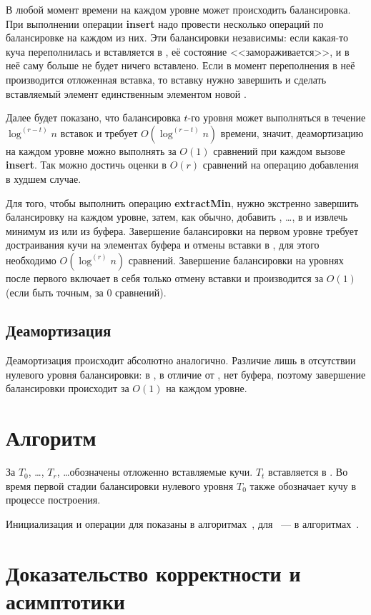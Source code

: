 В любой момент времени на каждом уровне может происходить балансировка. При выполнении
операции \textbf{insert} надо провести несколько операций по балансировке на каждом из них.
Эти балансировки независимы: если какая-то куча \MH[t] переполнилась и вставляется
в \MH[t+1], её состояние <<замораживается>>, и в неё саму больше не будет ничего вставлено.
Если в момент переполнения \MH[t] в неё производится отложенная вставка,
то вставку нужно завершить и сделать вставляемый элемент единственным
элементом новой \MH[t].

Далее будет показано, что балансировка $t$-го уровня может выполняться
в течение $\log^{(r-t)}n$ вставок и требует $O(\log^{(r-t)}n)$ времени,
значит, деамортизацию на каждом уровне
можно выполнять за $O(1)$ сравнений при каждом вызове \textbf{insert}. Так можно
достичь оценки в $O(r)$ сравнений на операцию добавления в худшем случае.

Для того, чтобы выполнить операцию \textbf{extractMin}, нужно экстренно завершить
балансировку на каждом уровне, затем, как обычно, добавить \MH[1], \dots, \MH[r] в \HH
и извлечь минимум из \HH или из буфера. Завершение балансировки на первом уровне
требует достраивания кучи на элементах буфера и отмены вставки в \MH[1], для этого
необходимо $O(\log^{(r)} n)$ сравнений. Завершение балансировки на уровнях после
первого включает в себя только отмену вставки и производится за $O(1)$ (если быть
точным, за 0 сравнений).

\subsection{Деамортизация \CH[*]}
Деамортизация \CH[*] происходит абсолютно аналогично. Различие лишь в отсутствии
нулевого уровня  балансировки: в \CH[*], в отличие от \CH[r], нет буфера,
поэтому завершение балансировки происходит за $O(1)$ на каждом уровне.

\section{Алгоритм}
За $T_0$, \dots, $T_{r}$, \dots обозначены отложенно вставляемые кучи.
$T_t$ вставляется в \MH[t+1]. Во время первой стадии балансировки нулевого
уровня $T_0$ также обозначает кучу в процессе построения.

Инициализация и операции для \CH[r] показаны в
алгоритмах~, для \CH[*]~---
в алгоритмах~.


\newpage
\section{Доказательство корректности и асимптотики} \label{sec:proof}

